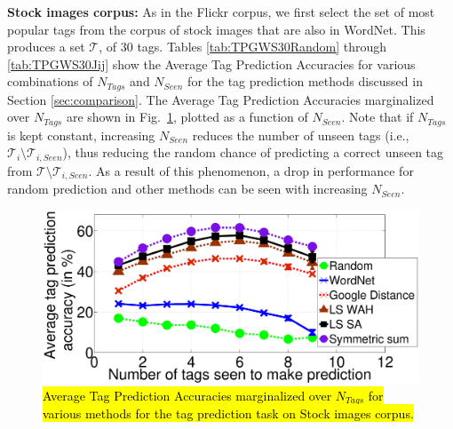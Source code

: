 \textbf{Stock images corpus:} As in the Flickr corpus, we first select the set of most popular tags from the corpus of stock images that are also in WordNet. This produces a set $\mathcal{T}$, of 30 tags. Tables \ref{tab:TPGWS30Random} through \ref{tab:TPGWS30Jij} show the Average Tag Prediction Accuracies for various combinations of $N_{Tags}$ and $N_{Seen}$ for the tag prediction methods discussed in Section \ref{sec:comparison}. 
The Average Tag Prediction Accuracies marginalized over $N_{Tags}$ are shown in  Fig.~\ref{fig:GWS30TagPredGraph}, plotted as a function of $N_{Seen}$.  
Note that if $N_{Tags}$ is kept constant, increasing $N_{Seen}$ reduces the number of unseen tags (i.e., $\mathcal{T}_i \setminus  \mathcal{T}_{i,Seen}$), thus reducing the random chance of predicting a correct unseen tag from $\mathcal{T} \setminus \mathcal{T}_{i,Seen}$.  As a result of this phenomenon, a drop in performance for random prediction and other methods can be seen with increasing $N_{Seen}$. \\
\begin{figure}[!ht]
\centering
\includegraphics[width=0.65\linewidth]{TagTree/RebuttalGWS_TP}
\caption{\hl{Average Tag Prediction Accuracies marginalized over $N_{Tags}$ for various methods for the tag prediction task on Stock images corpus.}}
\label{fig:GWS30TagPredGraph}
\end{figure}
